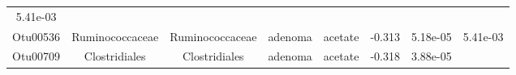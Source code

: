\documentclass[11pt,]{article}
\begin{document}
\begin{longtable}[]{@{}cccccccc@{}}
\begin{minipage}[t]{0.08\columnwidth}
5.41e-03\strut
\end{minipage}\tabularnewline
\begin{minipage}[t]{0.08\columnwidth}\centering\strut
Otu00536\strut
\end{minipage} & \begin{minipage}[t]{0.15\columnwidth}\centering\strut
Ruminococcaceae\strut
\end{minipage} & \begin{minipage}[t]{0.15\columnwidth}\centering\strut
Ruminococcaceae\strut
\end{minipage} & \begin{minipage}[t]{0.08\columnwidth}\centering\strut
adenoma\strut
\end{minipage} & \begin{minipage}[t]{0.09\columnwidth}\centering\strut
acetate\strut
\end{minipage} & \begin{minipage}[t]{0.07\columnwidth}\centering\strut
-0.313\strut
\end{minipage} & \begin{minipage}[t]{0.08\columnwidth}\centering\strut
5.18e-05\strut
\end{minipage} & \begin{minipage}[t]{0.08\columnwidth}\centering\strut
5.41e-03\strut
\end{minipage}\tabularnewline
\begin{minipage}[t]{0.08\columnwidth}\centering\strut
Otu00709\strut
\end{minipage} & \begin{minipage}[t]{0.15\columnwidth}\centering\strut
Clostridiales\strut
\end{minipage} & \begin{minipage}[t]{0.15\columnwidth}\centering\strut
Clostridiales\strut
\end{minipage} & \begin{minipage}[t]{0.08\columnwidth}\centering\strut
adenoma\strut
\end{minipage} & \begin{minipage}[t]{0.09\columnwidth}\centering\strut
acetate\strut
\end{minipage} & \begin{minipage}[t]{0.07\columnwidth}\centering\strut
-0.318\strut
\end{minipage} & \begin{minipage}[t]{0.08\columnwidth}\centering\strut
3.88e-05\strut
\end{minipage} & \begin{minipage}[t]{0.08\columnwidth}\centering\strut

\end{minipage}
\end{longtable}
\end{document}
